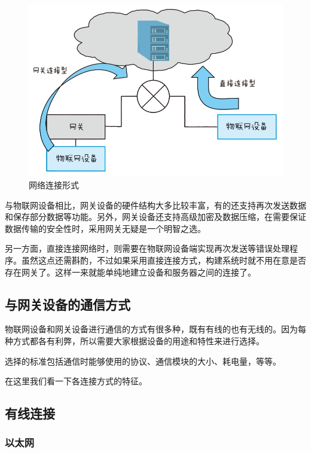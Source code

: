 \documentclass[12pt,UTF8]{ctexbook}
\begin{document}
\begin{figure}[htbp]
	\centering
	\includegraphics[width=1\linewidth]{72}
	\caption{网络连接形式}
	\label{fig:1}
\end{figure}

与物联网设备相比，网关设备的硬件结构大多比较丰富，有的还支持再次发送数据和保存部分数据等功能。另外，网关设备还支持高级加密及数据压缩，在需要保证数据传输的安全性时，采用网关无疑是一个明智之选。

另一方面，直接连接网络时，则需要在物联网设备端实现再次发送等错误处理程序。虽然这点还需斟酌，不过如果采用直接连接方式，构建系统时就不用在意是否存在网关了。这样一来就能单纯地建立设备和服务器之间的连接了。

\subsection{与网关设备的通信方式}

物联网设备和网关设备进行通信的方式有很多种，既有有线的也有无线的。因为每种方式都各有利弊，所以需要大家根据设备的用途和特性来进行选择。

选择的标准包括通信时能够使用的协议、通信模块的大小、耗电量，等等。

在这里我们看一下各连接方式的特征。

\subsection{有线连接}

\subsubsection{以太网}
\end{document}
